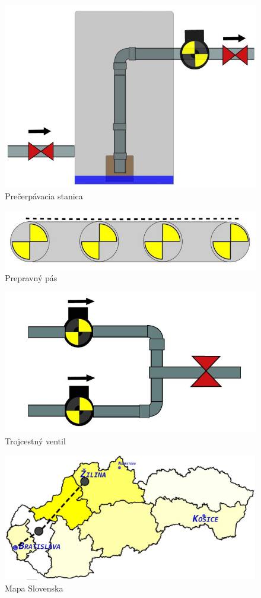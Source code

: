\begin{figure}[H]
	\centering
	\includegraphics[width=0.7\linewidth]{obrazky/pump}
	\caption{Prečerpávacia stanica}
	\label{fig:pump}
\end{figure}
\begin{figure}[H]
	\centering
	\includegraphics[width=0.7\linewidth]{obrazky/belt}
	\caption{Prepravný pás}
	\label{fig:belt}
\end{figure}
\begin{figure}[H]
	\centering
	\includegraphics[width=0.7\linewidth]{obrazky/trippleValve}
	\caption{Trojcestný ventil}
	\label{fig:trippleValve}
\end{figure}
\begin{figure}[H]
	\centering
	\includegraphics[width=0.7\linewidth]{obrazky/map}
	\caption{Mapa Slovenska}
	\label{fig:map}
\end{figure}



